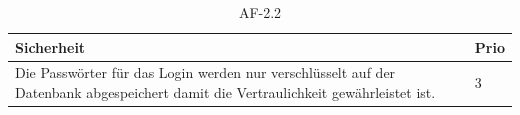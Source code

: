 \begin{table}[ht]
  \centering
  \settowidth{}
  \setlength\extrarowheight{2pt}
  \begin{tabulary}{1.0\textwidth}{|m{16cm}|L|}
    \hline
    \textbf{Sicherheit}&\textbf{Prio}\\
    \hline
    Die Passwörter für das Login werden nur verschlüsselt auf der Datenbank abgespeichert damit die Vertraulichkeit gewährleistet ist. & 3\\ 
    \hline
  \end{tabulary}
  \caption{AF-2.2}
  \label{af2.2}
\end{table}